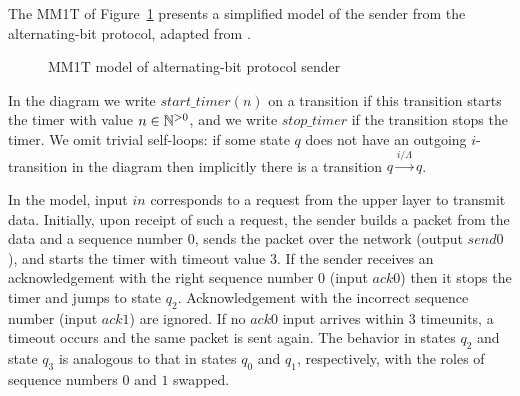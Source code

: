 \begin{example}
The MM1T of Figure~\ref{fig:abp} presents a simplified model of the sender from 
the alternating-bit protocol, adapted from \cite[Figure 3.15]{KR13}.
\begin{figure}[h]
\centering
\vspace{-2 em}
\caption{MM1T model of alternating-bit protocol sender}
\label{fig:abp}
\end{figure}
In the diagram we write $\mathit{start\_timer(n)}$ on a transition if this transition starts the
timer with value $n \in{\mathbb N}^{>0}$, and we write $\mathit{stop\_timer}$ if the transition stops the timer.
We omit trivial self-loops: if some state $q$ does not have an outgoing $i$-transition in the diagram
then implicitly there is a transition $q \xrightarrow{i/\Lambda} q$.

In the model, input $\mathit{in}$ corresponds to a request from the upper layer to transmit data.
Initially, upon receipt of such a request, the sender builds a packet from the data and a sequence number $0$,
sends the packet over the network (output $\mathit{send0}$), and starts the timer with timeout value $3$.
If the sender receives an acknowledgement with the right sequence number $0$ (input $\mathit{ack0}$) 
then it stops the timer and jumps to state $q_2$.
Acknowledgement with the incorrect sequence number (input $\mathit{ack1}$) are ignored.
If no $\mathit{ack0}$ input arrives within $3$ timeunits, a timeout occurs and the same packet is sent again.
The behavior in states $q_2$ and state $q_3$ is analogous to that in states $q_0$ and $q_1$, respectively,
with the roles of sequence numbers $0$ and $1$ swapped.
\end{example}

